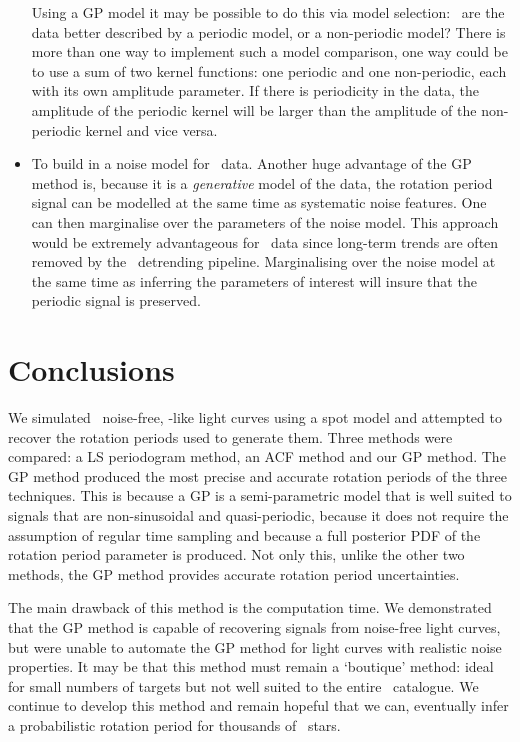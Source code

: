 \begin{itemize}
{Using a GP model it may be possible to do this via model selection: \ie\ are
the data better described by a periodic model, or a non-periodic model?
There is more than one way to implement such a model comparison, one way could
be to use a sum of two kernel functions: one periodic and one non-periodic,
each with its own amplitude parameter.
If there is periodicity in the data, the amplitude of the periodic kernel will
be larger than the amplitude of the non-periodic kernel and vice versa.}
\item{To build in a noise model for \kepler\ data.
Another huge advantage of the GP method is, because it is a {\it generative}
model of the data, the rotation period signal can be modelled at the same time
as systematic noise features.
One can then marginalise over the parameters of the noise model.
This approach would be extremely advantageous for \kepler\ data since
long-term trends are often removed by the \kepler\ detrending pipeline.
Marginalising over the noise model at the same time as inferring the
parameters of interest will insure that the periodic signal is preserved.}
\end{itemize}

\section{Conclusions}

We simulated \nlightcurves\ noise-free, \kepler-like light curves using a spot
model and attempted to recover the rotation periods used to generate them.
Three methods were compared: a LS periodogram method, an ACF method and our GP
method.
The GP method produced the most precise and accurate rotation periods of the
three techniques.
This is because a GP is a semi-parametric model that is well suited to signals
that are non-sinusoidal and quasi-periodic, because it does not require the
assumption of regular time sampling and because a full posterior PDF of the
rotation period parameter is produced.
Not only this, unlike the other two methods, the GP method provides accurate
rotation period uncertainties.

The main drawback of this method is the computation time.
We demonstrated that the GP method is capable of recovering signals from
noise-free light curves, but were unable to automate the GP method for light
curves with realistic noise properties.
It may be that this method must remain a `boutique' method: ideal for small
numbers of targets but not well suited to the entire \kepler\ catalogue.
We continue to develop this method and remain hopeful that we can, eventually
infer a probabilistic rotation period for thousands of \kepler\ stars.
